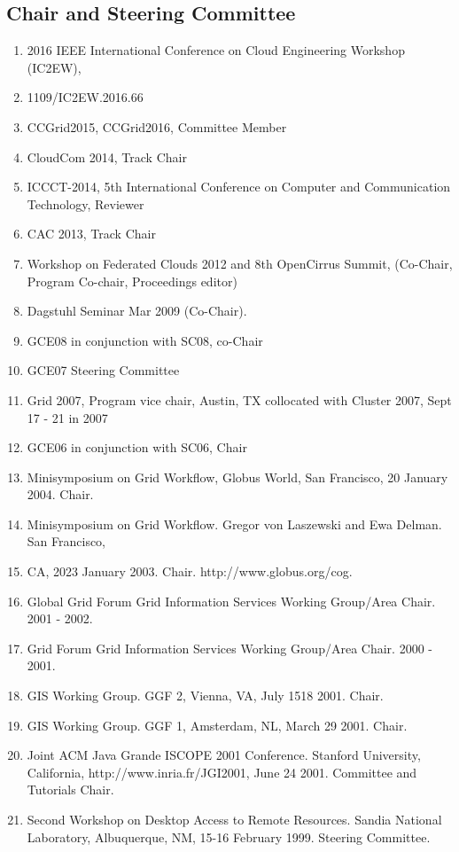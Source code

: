 \documentclass{article}
\begin{document}
\subsection{Chair and Steering Committee} 

\begin{enumerate}
\item  2016 IEEE International Conference on Cloud Engineering Workshop (IC2EW), 
\item 1109/IC2EW.2016.66
\item  CCGrid2015, CCGrid2016, Committee Member
\item  CloudCom 2014, Track Chair
\item  ICCCT-2014, 5th International Conference on Computer and Communication Technology, Reviewer
\item  CAC 2013, Track Chair
\item  Workshop on Federated Clouds  2012 and 8th OpenCirrus Summit, (Co-Chair, Program Co-chair, Proceedings editor)
\item  Dagstuhl Seminar Mar 2009 (Co-Chair).
\item  GCE08 in conjunction with SC08, co-Chair 
\item  GCE07 Steering Committee 
\item  Grid 2007, Program vice chair, Austin, TX collocated with Cluster 2007, Sept 17 - 21 in 2007 
\item  GCE06 in conjunction with SC06, Chair 
\item  Minisymposium on Grid Workflow, Globus World, San Francisco, 20 January 2004. Chair. 
\item  Minisymposium on Grid Workflow. Gregor von Laszewski and Ewa Delman. San Francisco, 
\item  CA, 2023 January 2003. Chair. http://www.globus.org/cog. 
\item  Global Grid Forum Grid Information Services Working Group/Area Chair. 2001 - 2002. 
\item  Grid Forum Grid Information Services Working Group/Area Chair. 2000 - 2001. 
\item  GIS Working Group. GGF 2, Vienna, VA, July 1518 2001. Chair. 
\item  GIS Working Group. GGF 1, Amsterdam, NL, March 29 2001. Chair. 
\item  Joint ACM Java Grande ISCOPE 2001 Conference. Stanford University, California, http://www.inria.fr/JGI2001, June 24 2001. Committee and Tutorials Chair. 
\item  Second Workshop on Desktop Access to Remote Resources. Sandia National Laboratory, Albuquerque, NM, 15-16 February 1999. Steering Committee. 

\end{enumerate}
\end{document}
